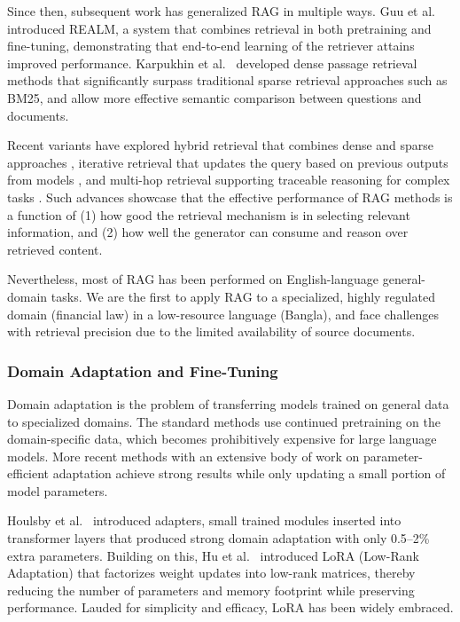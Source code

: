 \documentclass{article}
\begin{document}
Since then, subsequent work has generalized RAG in multiple ways. Guu et
al.~\cite{Guu2020} introduced REALM, a system that combines retrieval in both
pretraining and fine-tuning, demonstrating that end-to-end learning of the retriever
attains improved performance. Karpukhin et al.~\cite{karpukhin2020} developed dense
passage retrieval methods that significantly surpass traditional sparse retrieval
approaches such as BM25, and allow more effective semantic comparison between questions
and documents.

Recent variants have explored hybrid retrieval that combines dense and sparse
approaches \cite{weinberg2026}, iterative retrieval that updates the query based on
previous outputs from models \cite{wang2025}, and multi-hop retrieval supporting
traceable reasoning for complex tasks \cite{Asai2020}. Such advances showcase that the
effective performance of RAG methods is a function of (1) how good the retrieval
mechanism is in selecting relevant information, and (2) how well the generator can
consume and reason over retrieved content.

Nevertheless, most of RAG has been performed on English-language general-domain tasks.
We are the first to apply RAG to a specialized, highly regulated domain (financial law)
in a low-resource language (Bangla), and face challenges with retrieval precision due
to the limited availability of source documents.

\subsubsection{Domain Adaptation and Fine-Tuning}

Domain adaptation is the problem of transferring models trained on general data to
specialized domains. The standard methods use continued pretraining on the
domain-specific data, which becomes prohibitively expensive for large language models.
More recent methods with an extensive body of work on parameter-efficient adaptation
achieve strong results while only updating a small portion of model parameters.

Houlsby et al.~\cite{Houlsby2019} introduced adapters, small trained modules inserted
into transformer layers that produced strong domain adaptation with only 0.5--2\% extra
parameters. Building on this, Hu et al.~\cite{Hu2021} introduced LoRA (Low-Rank
Adaptation) that factorizes weight updates into low-rank matrices, thereby reducing the
number of parameters and memory footprint while preserving performance. Lauded for
simplicity and efficacy, LoRA has been widely embraced.
\end{document}
